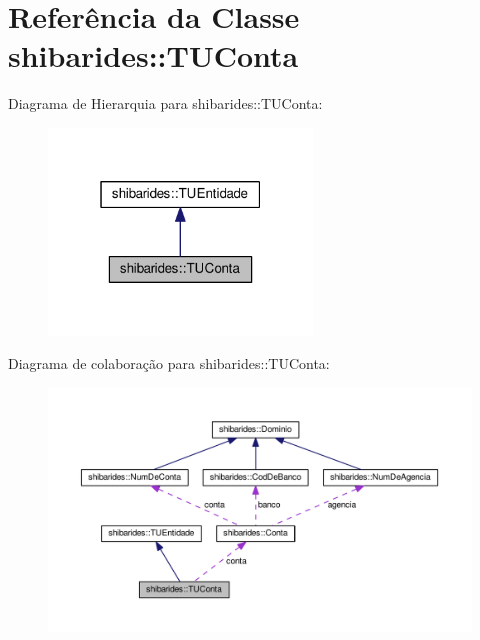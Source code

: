 \hypertarget{classshibarides_1_1TUConta}{}\section{Referência da Classe shibarides\+:\+:T\+U\+Conta}
\label{classshibarides_1_1TUConta}


Diagrama de Hierarquia para shibarides\+:\+:T\+U\+Conta\+:\nopagebreak
\begin{figure}[H]
\begin{center}
\leavevmode
\includegraphics[width=199pt]{classshibarides_1_1TUConta__inherit__graph}
\end{center}
\end{figure}


Diagrama de colaboração para shibarides\+:\+:T\+U\+Conta\+:\nopagebreak
\begin{figure}[H]
\begin{center}
\leavevmode
\includegraphics[width=350pt]{classshibarides_1_1TUConta__coll__graph}
\end{center}
\end{figure}

